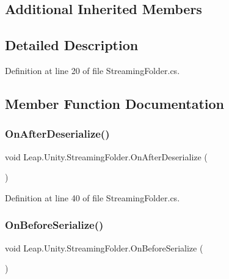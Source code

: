 \subsection*{Additional Inherited Members}


\subsection{Detailed Description}


Definition at line 20 of file Streaming\+Folder.\+cs.



\subsection{Member Function Documentation}
\mbox{\label{class_leap_1_1_unity_1_1_streaming_folder_a9d338a4b87762d482ea95f7c5a5ef292}} 
\subsubsection{\texorpdfstring{OnAfterDeserialize()}{OnAfterDeserialize()}}
{\footnotesize\ttfamily void Leap.\+Unity.\+Streaming\+Folder.\+On\+After\+Deserialize (\begin{DoxyParamCaption}{ }\end{DoxyParamCaption})}



Definition at line 40 of file Streaming\+Folder.\+cs.

\mbox{\label{class_leap_1_1_unity_1_1_streaming_folder_ab88eea3ab191470aec844e84a659ff3c}} 
\subsubsection{\texorpdfstring{OnBeforeSerialize()}{OnBeforeSerialize()}}
{\footnotesize\ttfamily void Leap.\+Unity.\+Streaming\+Folder.\+On\+Before\+Serialize (\begin{DoxyParamCaption}{ }\end{DoxyParamCaption})}



